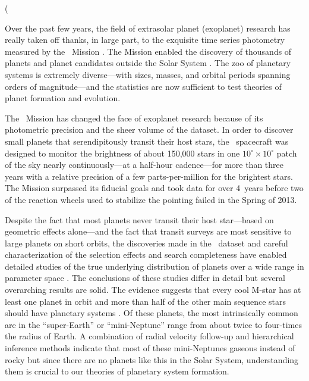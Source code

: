 (

Over the past few years, the field of extrasolar planet (exoplanet) research
has really taken off thanks, in large part, to the exquisite time series
photometry measured by the \kepler\ Mission \citep{Borucki:2010}.
The Mission enabled the discovery of thousands of planets and planet
candidates outside the Solar System \citep{Rowe:2015}.
The zoo of planetary systems is extremely diverse---with sizes, masses, and
orbital periods spanning orders of magnitude---and the statistics are now
sufficient to test theories of planet formation and evolution.

The \kepler\ Mission has changed the face of exoplanet research because of its
photometric precision and the sheer volume of the dataset.
In order to discover small planets that serendipitously transit their host
stars, the \kepler\ spacecraft was designed to monitor the brightness of about
150,000 stars in one $10^\circ \times 10^\circ$ patch of the sky nearly
continuously---at a half-hour cadence---for more than three years with a
relative precision of a few parts-per-million for the brightest stars.
The Mission surpassed its fiducial goals and took data for over 4~years before
two of the reaction wheels used to stabilize the pointing failed in the Spring
of 2013.

Despite the fact that most planets never transit their host star---based on
geometric effects alone---and the fact that transit surveys are most sensitive
to large planets on short orbits, the discoveries made in the \kepler\ dataset
and careful characterization of the selection effects and search completeness
have enabled detailed studies of the true underlying distribution of planets
over a wide range in parameter space \citep[examples include][and
]{Howard:2012, Petigura:2013, Foreman-Mackey:2014,
Dressing:2015}.
The conclusions of these studies differ in detail but several overarching
results are solid.
The evidence suggests that every cool M-star has at least one planet in orbit
\citep{Dressing:2013, Dressing:2015} and more than half of the other main
sequence stars should have planetary systems \citep{Howard:2012, Fressin:2013,
Petigura:2013, Foreman-Mackey:2014}.
Of these planets, the most intrinsically common are in the ``super-Earth'' or
``mini-Neptune'' range from about twice to four-times the radius of Earth.
A combination of radial velocity follow-up and hierarchical inference methods
indicate that most of these mini-Neptunes gaseous instead of rocky
\citep{Weiss:2014, Rogers:2015} but since there are no planets like this in
the Solar System, understanding them is crucial to our theories of planetary
system formation.

